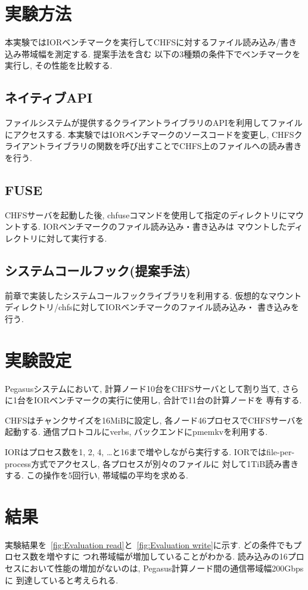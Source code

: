 \documentclass[a4paper,11pt]{jreport}
\begin{document}
\section{実験方法}
本実験ではIORベンチマークを実行してCHFSに対するファイル読み込み/書き込み帯域幅を測定する. 提案手法を含む
以下の3種類の条件下でベンチマークを実行し, その性能を比較する. 

\subsection{ネイティブAPI}
ファイルシステムが提供するクライアントライブラリのAPIを利用してファイルにアクセスする. 本実験ではIORベンチマークのソースコードを変更し, 
CHFSクライアントライブラリの関数を呼び出すことでCHFS上のファイルへの読み書きを行う. 
\subsection{FUSE}
CHFSサーバを起動した後, chfuseコマンドを使用して指定のディレクトリにマウントする. IORベンチマークのファイル読み込み・書き込みは
マウントしたディレクトリに対して実行する. 
\subsection{システムコールフック(提案手法)}
前章で実装したシステムコールフックライブラリを利用する. 仮想的なマウントディレクトリ/chfsに対してIORベンチマークのファイル読み込み・
書き込みを行う. 
\section{実験設定}
Pegasusシステムにおいて, 計算ノード10台をCHFSサーバとして割り当て, さらに1台をIORベンチマークの実行に使用し, 合計で11台の計算ノードを
専有する. 

CHFSはチャンクサイズを16MiBに設定し, 各ノード46プロセスでCHFSサーバを起動する. 通信プロトコルにverbs, バックエンドにpmemkvを利用する. 

IORはプロセス数を1, 2, 4, …と16まで増やしながら実行する. IORではfile-per-process方式でアクセスし, 各プロセスが別々のファイルに
対して1TiB読み書きする. この操作を5回行い, 帯域幅の平均を求める. 
\section{結果}

実験結果を\figurename~\ref{fig:Evaluation read}と\figurename~\ref{fig:Evaluation write}に示す. どの条件でもプロセス数を増やすに
つれ帯域幅が増加していることがわかる. 読み込みの16プロセスにおいて性能の増加がないのは, Pegasus計算ノード間の通信帯域幅200Gbpsに
到達していると考えられる. 
\end{document}
